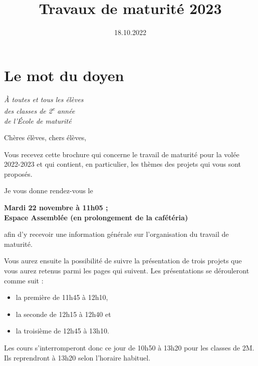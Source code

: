 \documentclass[
  10pt,
  french,
  a5paper,
  openany]{book}
\title{Travaux de maturité 2023}
\author{}
\date{\vspace{-2.5em}18.10.2022}
\providecommand{\tightlist}{%
  \setlength{\itemsep}{0pt}\setlength{\parskip}{0pt}}
\newenvironment{signature}{\begin{flushright}}{\end{flushright}}
\newenvironment{centerbold}{\begin{center}\bfseries}{\end{center}}
\begin{document}
\maketitle

{
\setcounter{tocdepth}{0}
\tableofcontents
}
\hypertarget{le-mot-du-doyen}{%
\chapter*{Le mot du doyen}\label{le-mot-du-doyen}}


\begin{signature}
\emph{À toutes et tous les élèves}\\
\emph{des classes de 2\textsuperscript{e} année}\\
\emph{de l'École de maturité}

\end{signature}


Chères élèves, chers élèves,

Vous recevez cette brochure qui concerne le travail de maturité pour la volée 2022-2023 et qui contient, en particulier, les thèmes des projets qui vous sont proposés.

Je vous donne rendez-vous le

\begin{centerbold}
Mardi 22 novembre à 11h05 ;\\
Espace Assemblée (en prolongement de la cafétéria)

\end{centerbold}

afin d'y recevoir une information générale sur l'organisation du travail de maturité.

Vous aurez ensuite la possibilité de suivre la présentation de trois projets que vous aurez retenus parmi les pages qui suivent. Les présentations se dérouleront comme suit :

\begin{itemize}
\tightlist
\item
  la première de 11h45 à 12h10,
\item
  la seconde de 12h15 à 12h40 et
\item
  la troisième de 12h45 à 13h10.
\end{itemize}

Les cours s'interromperont donc ce jour de 10h50 à 13h20 pour les classes de 2M. Ils reprendront à 13h20 selon l'horaire habituel.
\end{document}
